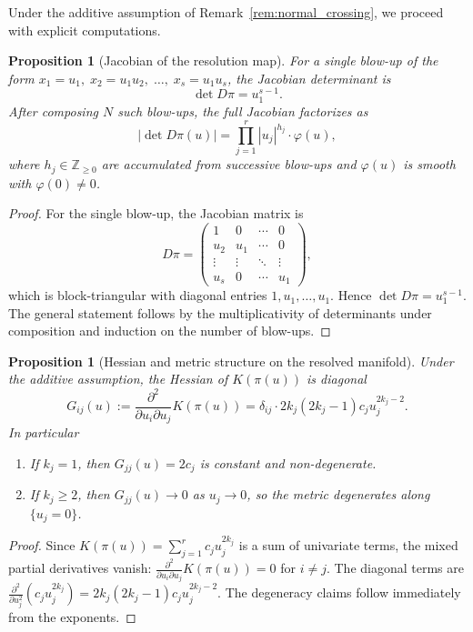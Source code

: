 \documentclass[11pt,letterpaper]{amsart}
\numberwithin{equation}{section}
\theoremstyle{plain}
\newtheorem{proposition}[theorem]{Proposition}
\theoremstyle{definition}
\theoremstyle{remark}
\begin{document}
Under the additive assumption of Remark~\ref{rem:normal_crossing}, we proceed with explicit computations.

\begin{proposition}[Jacobian of the resolution map]
\label{prop:jacobian_resolution}
For a single blow-up of the form $x_1 = u_1,\; x_2 = u_1 u_2,\; \ldots,\; x_s = u_1 u_s$, the Jacobian determinant is
\[
\det D\pi = u_1^{s-1}.
\]
After composing $N$ such blow-ups, the full Jacobian factorizes as
\[
|\det D\pi(u)| = \prod_{j=1}^r |u_j|^{h_j} \cdot \varphi(u),
\]
where $h_j \in \mathbb{Z}_{\geq 0}$ are accumulated from successive blow-ups and $\varphi(u)$ is smooth with $\varphi(0) \neq 0$.
\end{proposition}

\begin{proof}
For the single blow-up, the Jacobian matrix is
\[
D\pi =
\begin{pmatrix}
1 & 0 & \cdots & 0 \\
u_2 & u_1 & \cdots & 0 \\
\vdots & \vdots & \ddots & \vdots \\
u_s & 0 & \cdots & u_1
\end{pmatrix},
\]
which is block-triangular with diagonal entries $1, u_1, \ldots, u_1$. Hence $\det D\pi = u_1^{s-1}$. The general statement follows by the multiplicativity of determinants under composition and induction on the number of blow-ups.
\end{proof}

\begin{proposition}[Hessian and metric structure on the resolved manifold]
\label{prop:hessian_resolved}
Under the additive assumption, the Hessian of $K(\pi(u))$ is diagonal
\[
G_{ij}(u) := \frac{\partial^2}{\partial u_i \partial u_j} K(\pi(u))
=
\delta_{ij} \cdot 2k_j (2k_j - 1) c_j u_j^{2k_j - 2}.
\]
In particular
\begin{enumerate}
\item If $k_j = 1$, then $G_{jj}(u) = 2c_j$ is constant and non-degenerate.
\item If $k_j \geq 2$, then $G_{jj}(u) \to 0$ as $u_j \to 0$, so the metric degenerates along $\{u_j = 0\}$.
\end{enumerate}
\end{proposition}

\begin{proof}
Since $K(\pi(u)) = \sum_{j=1}^r c_j u_j^{2k_j}$ is a sum of univariate terms, the mixed partial derivatives vanish: $\frac{\partial^2}{\partial u_i \partial u_j} K(\pi(u)) = 0$ for $i \neq j$. The diagonal terms are
$\frac{\partial^2}{\partial u_j^2}(c_j u_j^{2k_j}) = 2k_j(2k_j-1)c_j u_j^{2k_j-2}$.
The degeneracy claims follow immediately from the exponents.
\end{proof}
\end{document}

